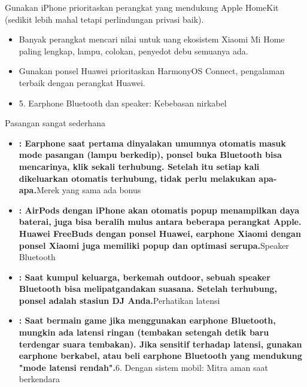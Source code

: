 Gunakan iPhone prioritaskan perangkat yang mendukung Apple HomeKit (sedikit lebih mahal tetapi perlindungan privasi baik).

\begin{itemize}
  \item Banyak perangkat mencari nilai untuk uang ekosistem Xiaomi Mi Home paling lengkap, lampu, colokan, penyedot debu semuanya ada.
  \item Gunakan ponsel Huawei prioritaskan HarmonyOS Connect, pengalaman terbaik dengan perangkat Huawei.
  \item 5. Earphone Bluetooth dan speaker: Kebebasan nirkabel
\end{itemize}


Pasangan sangat sederhana

\begin{itemize}
  \item \textbf{: Earphone saat pertama dinyalakan umumnya otomatis masuk mode pasangan (lampu berkedip), ponsel buka Bluetooth bisa mencarinya, klik sekali terhubung. Setelah itu setiap kali dikeluarkan otomatis terhubung, tidak perlu melakukan apa-apa.}Merek yang sama ada bonus
  \item \textbf{: AirPods dengan iPhone akan otomatis popup menampilkan daya baterai, juga bisa beralih mulus antara beberapa perangkat Apple. Huawei FreeBuds dengan ponsel Huawei, earphone Xiaomi dengan ponsel Xiaomi juga memiliki popup dan optimasi serupa.}Speaker Bluetooth
  \item \textbf{: Saat kumpul keluarga, berkemah outdoor, sebuah speaker Bluetooth bisa melipatgandakan suasana. Setelah terhubung, ponsel adalah stasiun DJ Anda.}Perhatikan latensi
  \item \textbf{: Saat bermain game jika menggunakan earphone Bluetooth, mungkin ada latensi ringan (tembakan setengah detik baru terdengar suara tembakan). Jika sensitif terhadap latensi, gunakan earphone berkabel, atau beli earphone Bluetooth yang mendukung "mode latensi rendah".}6. Dengan sistem mobil: Mitra aman saat berkendara
\end{itemize}

